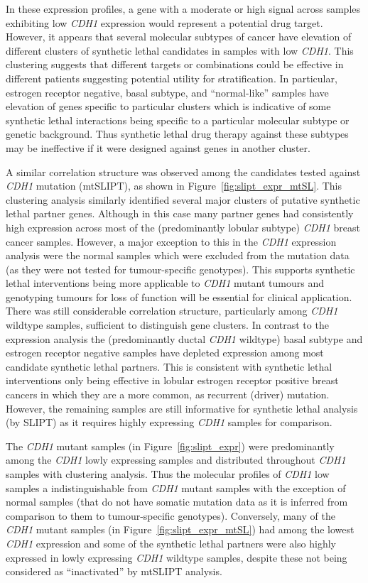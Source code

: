 In these expression profiles, a gene with a moderate or high signal across samples exhibiting low \textit{CDH1} expression would represent a potential drug target. However, it appears that several molecular subtypes of cancer have elevation of different clusters of synthetic lethal candidates in samples with low \textit{CDH1}. This clustering suggests that different targets or combinations could be effective in different patients suggesting potential utility for stratification.  In particular, estrogen receptor negative, basal subtype, and ``normal-like'' samples \cite{Eroles2012, Parker2009, Dai2015} have elevation of genes specific to particular clusters which is indicative of some synthetic lethal interactions being specific to a particular molecular subtype or genetic background. Thus synthetic lethal drug therapy against these subtypes may be ineffective if it were designed against genes in another cluster.
 

A similar correlation structure was observed among the candidates tested against \textit{CDH1} mutation (mtSLIPT), as shown in Figure~\ref{fig:slipt_expr_mtSL}. This clustering analysis similarly identified several major clusters of putative synthetic lethal partner genes. Although in this case many partner genes had consistently high expression across most of the (predominantly lobular subtype) \textit{CDH1} breast cancer samples. However, a major exception to this in the \textit{CDH1} expression analysis were the normal samples which were excluded from the mutation data (as they were not tested for tumour-specific genotypes). This supports synthetic lethal interventions being more applicable to \textit{CDH1} mutant tumours and genotyping tumours for loss of function will be essential for clinical application. There was still considerable correlation structure, particularly among \textit{CDH1} wildtype samples, sufficient to distinguish gene clusters. In contrast to the expression analysis the (predominantly ductal \textit{CDH1} wildtype) basal subtype and estrogen receptor negative samples have depleted expression among most candidate synthetic lethal partners. This is consistent with synthetic lethal interventions only being effective in lobular estrogen receptor positive breast cancers in which they are a more common, as recurrent (driver) mutation. However, the remaining samples are still informative for synthetic lethal analysis (by SLIPT) as it requires highly expressing \textit{CDH1} samples for comparison.

The \textit{CDH1} mutant samples (in Figure~\ref{fig:slipt_expr}) were predominantly among the \textit{CDH1} lowly expressing samples and distributed throughout \textit{CDH1} samples with clustering analysis. Thus the molecular profiles of \textit{CDH1} low samples a indistinguishable from \textit{CDH1} mutant samples with the exception of normal samples (that do not have somatic mutation data as it is inferred from comparison to them to tumour-specific genotypes). Conversely, many of the \textit{CDH1} mutant samples (in Figure~\ref{fig:slipt_expr_mtSL}) had among the lowest \textit{CDH1} expression and some of the synthetic lethal partners were also highly expressed in lowly expressing \textit{CDH1} wildtype samples, despite these not being considered as ``inactivated'' by mtSLIPT analysis.

